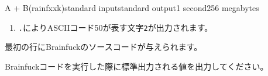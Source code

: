 \begin{problem}{A + B(rainfxxk)}{standard input}{standard output}{1 second}{256 megabytes}
\begin{enumerate}
\item 
\texttt{.}によりASCIIコード50が表す文字\texttt{2}が出力されます。


\end{enumerate}


\InputFile
最初の行にBrainfuckのソースコードが与えられます。

\OutputFile
Brainfuckコードを実行した際に標準出力される値を出力してください。

\Examples

\begin{example}
%
%
\end{example}

\end{problem}

